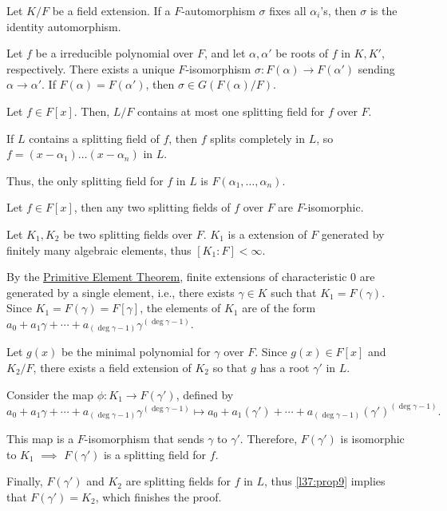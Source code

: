 \begin{cor}[$K = K'$] \label{l37:cor7}
	Let $K / F$ be a field extension.
	If a $F$-automorphism $\sigma$ fixes all $\alpha_i$'s, then $\sigma$ is the identity automorphism.
\end{cor}

\begin{lem}
	Let $f$ be a irreducible polynomial over $F$, and let $\alpha, \alpha'$ be roots of $f$ in $K, K'$, respectively. There exists a unique $F$-isomorphism $\sigma: F(\alpha) \to F(\alpha')$ sending $\alpha \to \alpha'$. If  $F(\alpha) = F(\alpha')$, then $\sigma \in G(F(\alpha)/F)$.
\end{lem}

\begin{prop}\label{l37:prop9}
	Let $f \in F[x]$. Then, $L/F$ contains at most one splitting field for $f$ over $F$.
\end{prop}

\begin{dem}
	If $L$ contains a splitting field of $f$, then $f$ splits completely in $L$, so $f = (x-\alpha_1)\dots(x-\alpha_n)$ in $L$.

	Thus, the only splitting field for $f$ in $L$ is $F(\alpha_1, \dots, \alpha_n)$.
\end{dem}

\begin{prop}
	Let $f \in F[x]$, then any two splitting fields of $f$ over $F$ are $F$-isomorphic.
\end{prop}

\begin{dem}
	Let $K_1, K_2$ be two splitting fields over $F$. $K_1$ is a extension of $F$ generated by finitely many algebraic elements, thus $[K_1 : F] < \infty$.

	By the \hyperlink{l34:thm8}{Primitive Element Theorem}, finite extensions of characteristic $0$ are generated by a single element, i.e., there exists $\gamma \in K$ such that $K_1 = F(\gamma)$.
	Since $K_1 = F(\gamma) = F[\gamma]$, the elements of $K_1$ are of the form $a_0 + a_1\gamma + \cdots + a_{(\deg\gamma - 1)}\gamma^{(\deg\gamma - 1)}$.

	Let $g(x)$ be the minimal polynomial for $\gamma$ over $F$. Since $g(x) \in F[x]$ and $K_2 / F$, there exists a field extension of $K_2$ so that $g$ has a root $\gamma'$ in $L$. 

	Consider the map $\phi: K_1 \to F(\gamma')$, defined by \[
		a_0 + a_1\gamma + \cdots + a_{(\deg\gamma - 1)}\gamma^{(\deg\gamma - 1)} \mapsto 
		a_0 + a_1(\gamma') + \cdots + a_{(\deg\gamma - 1)}(\gamma')^{(\deg\gamma - 1)}.
	\]

	This map is a $F$-isomorphism that sends $\gamma$ to $\gamma'$. Therefore, $F(\gamma')$ is isomorphic to $K_1$  $\implies$ $F(\gamma')$ is a splitting field for $f$.

	Finally, $F(\gamma')$ and $K_2$ are splitting fields for $f$ in $L$, thus \cref{l37:prop9} implies that $F(\gamma') = K_2$, which finishes the proof.
\end{dem}


